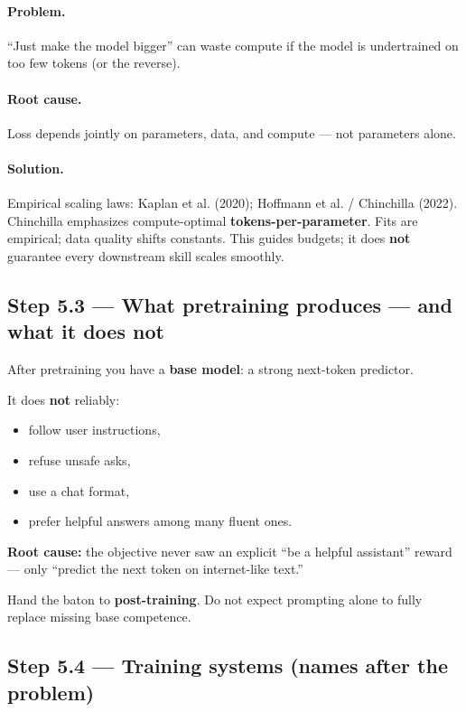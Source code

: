 \documentclass[11pt,a4paper]{article}
\begin{document}
\paragraph{Problem.}

``Just make the model bigger'' can waste compute if the model is undertrained on too few tokens (or the reverse).


\paragraph{Root cause.}

Loss depends jointly on parameters, data, and compute --- not parameters alone.


\paragraph{Solution.}

Empirical scaling laws: Kaplan et al. (2020); Hoffmann et al. / Chinchilla (2022). Chinchilla emphasizes compute-optimal \textbf{tokens-per-parameter}. Fits are empirical; data quality shifts constants. This guides budgets; it does \textbf{not} guarantee every downstream skill scales smoothly.


\subsection{Step 5.3 --- What pretraining produces --- and what it does not}


After pretraining you have a \textbf{base model}: a strong next-token predictor.


It does \textbf{not} reliably:

\begin{itemize}
\item follow user instructions,  
\item refuse unsafe asks,  
\item use a chat format,  
\item prefer helpful answers among many fluent ones.
\end{itemize}


\textbf{Root cause:} the objective never saw an explicit ``be a helpful assistant'' reward --- only ``predict the next token on internet-like text.''


Hand the baton to \textbf{post-training}. Do not expect prompting alone to fully replace missing base competence.


\subsection{Step 5.4 --- Training systems (names after the problem)}
\end{document}
